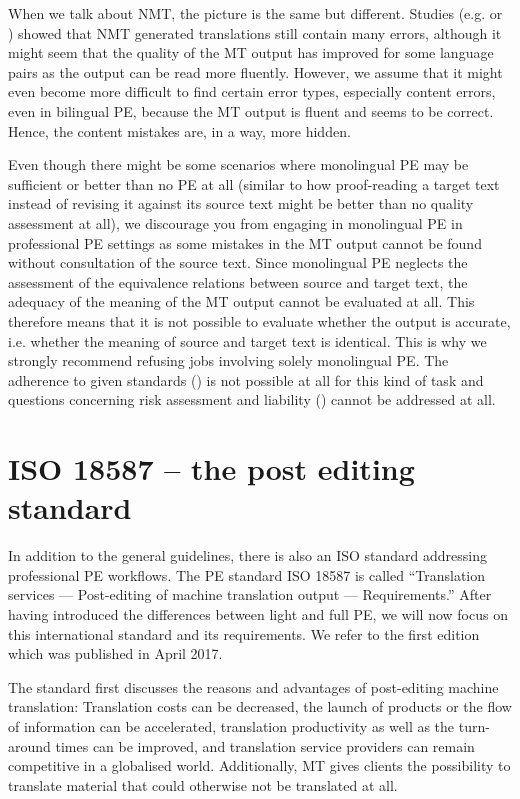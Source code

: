 When we talk about NMT, the picture is the same but different. Studies (e.g. \citealt{burchardt2017linguistic} or \citealt{macketanz2017machine}) showed that NMT generated translations still contain many errors, although it might seem that the quality of the MT output has improved for some language pairs as the output can be read more fluently. However, we assume that it might even become more difficult to find certain error types, especially content errors, even in bilingual PE, because the MT output is fluent and seems to be correct. Hence, the content mistakes are, in a way, more hidden.

Even though there might be some scenarios where monolingual PE may be sufficient or better than no PE at all (similar to how proof-reading a target text instead of revising it against its source text might be better than no quality assessment at all), we discourage you from engaging in monolingual PE in professional PE settings as some mistakes in the MT output cannot be found without consultation of the source text. Since monolingual PE neglects the assessment of the equivalence relations between source and target text, the adequacy of the meaning of the MT output cannot be evaluated at all. This therefore means that it is not possible to evaluate whether the output is accurate, i.e. whether the meaning of source and target text is identical. This is why we strongly recommend refusing jobs involving solely monolingual PE. The adherence to given standards () is not possible at all for this kind of task and questions concerning risk assessment and liability () cannot be addressed at all. 

\section{ISO 18587 -- the post editing standard}\label{sec:4:2}

In addition to the general guidelines, there is also an ISO standard addressing professional PE workflows. The PE standard ISO 18587 is called “Translation services — Post-editing of machine translation output — Requirements.” After having introduced the differences between light and full PE, we will now focus on this international standard and its requirements. We refer to the first edition which was published in April 2017.

The standard first discusses the reasons and advantages of post-editing machine translation: Translation costs can be decreased, the launch of products or the flow of information can be accelerated, translation productivity as well as the turn-around times can be improved, and translation service providers can remain competitive in a globalised world. Additionally, MT gives clients the possibility to translate material that could otherwise not be translated at all.

